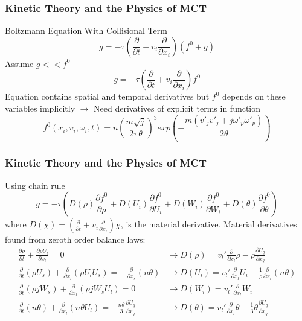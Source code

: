 \documentclass{beamer}
\begin{document}
\begin{frame}
  \frametitle{Kinetic Theory and the Physics of MCT}
  Boltzmann Equation With Collisional Term
  \begin{equation*}
\label{FirstOrderTransport}
 g = -\tau (\frac{\partial}{\partial t} + v_{i} \frac{\partial}{\partial 
x_{i}})(f^{0} + g)
\end{equation*}
Assume $g << f^{0}$
\begin{equation*}
 \label{FirstOrderTransportSimple}
  g = -\tau (\frac{\partial}{\partial t} + v_{i} \frac{\partial}{\partial 
x_{i}})f^{0}
\end{equation*}
Equation contains spatial and temporal derivatives but $f^{0}$ depends on these 
variables implicitly \pause $\rightarrow$ Need derivatives of explicit terms in 
function
\begin{equation*}
f^{0}(x_{i}, v_{i}, \omega_{i}, t) = n(\frac{m\sqrt{j}}{2\pi 
\theta})^3 exp(-\frac{m(v'_{j}v'_{j} + j\omega'_{p}\omega'_{p})}{2\theta})
\end{equation*}
\end{frame}


\begin{frame}
\frametitle{Kinetic Theory and the Physics of MCT}
 Using chain rule
\begin{equation*}
 g = -\tau(D(\rho)\frac{\partial f^0}{\partial \rho} + D(U_{i})\frac{\partial 
f^0}{\partial U_i} + D(W_i)\frac{\partial f^0}{\partial W_i} + 
D(\theta)\frac{\partial f^{0}}{\partial \theta})
\end{equation*}
where $D(\chi) = (\frac{\partial }{\partial t} + v_i\frac{\partial}{\partial 
x_i})\chi$, is the material derivative. Material derivatives found from zeroth 
order balance laws:\\
\pause
\begin{align*}
\label{zeroordercontMCT}
	\frac{\partial\rho}{\partial t} + \frac{\partial \rho U_l}{\partial 
x_l} = 0 &\rightarrow  D(\rho)=v_l'\frac{\partial}{\partial 
x_l}\rho-\rho\frac{\partial 
U_q}{\partial x_q}\\
\label{zeroordermomentMCT}
	\frac{\partial}{\partial t}(\rho U_s)+  \frac{\partial }{\partial 
x_{l}}(\rho U_lU_s)
=-\frac{\partial }{\partial x_s} (n\theta) &\rightarrow D(U_i)= 
v_l'\frac{\partial}{\partial x_l}U_i-\frac{1}{\rho}\frac{\partial 
}{\partial x_i} (n\theta)\\
\label{zeroorderangmomentMCT}
	\frac{\partial}{\partial t}(\rho jW_s) + \frac{\partial }{\partial 
x_l} (\rho jW_sU_l)
= 0 &\rightarrow D(W_i) = v_l'\frac{\partial}{\partial 
x_l}W_i \\
\label{zeroordereenergyMCT}
	\frac{\partial}{\partial t}(n\theta)+ \frac{\partial }{\partial x_l} 
(n\theta U_l)
=-\frac{n\theta}{3} \frac{\partial U_q}{\partial x_q} &\rightarrow 
D(\theta)=v_l'\frac{\partial}{\partial x_l}\theta-\frac{1}{3}\theta 
\frac{\partial U_q}{\partial x_q}
\end{align*}
\end{frame}
\end{document}
